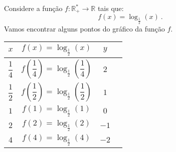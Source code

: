  \begin{exem} \label{ex:log-1/2}
    Considere a função $f: \mathbb{R_{+}^{*}} \rightarrow \mathbb{R} $ tais que:
\begin{equation*}
f(x) = \log_{\frac{1}{2}}(x) \ .
\end{equation*}
 Vamos encontrar alguns pontos do gráfico da função $f$.

  \begin{table}[H]
 \centering
 \begin{tabular}{|c|c|c|c|} \hline
 \rowcolor{gray}
 $x$ & $f(x) = \log_{\frac{1}{2}}(x)$ & $y$ \\ \hline
  $\dfrac{1}{4}$ & $f\left(\dfrac{1}{4}\right)= \log_{\frac{1}{2}}\left(\dfrac{1}{4}\right)$ & $2$ \\ \hline
 $\dfrac{1}{2}$ & $f\left(\dfrac{1}{2}\right)= \log_{\frac{1}{2}}\left(\dfrac{1}{2}\right)$ & $1$ \\ \hline
 $1$ & $f(1)= \log_{\frac{1}{2}}(1)$ & $0$ \\ \hline
 $2$ & $f(2)= \log_{\frac{1}{2}}(2)$ & $-1$ \\ \hline
 $4$ & $f(4)= \log_{\frac{1}{2}}(4)$ & $-2$ \\ \hline
 \end{tabular}
 \end{table}


   \begin{center}
    \end{center}
    

\end{exem}
